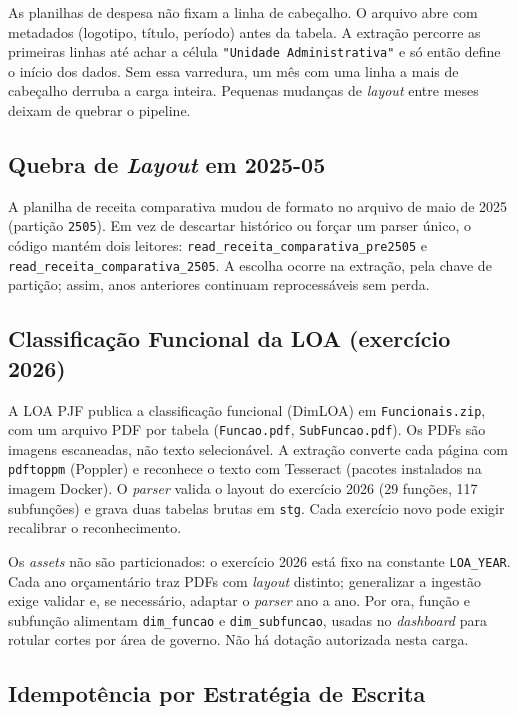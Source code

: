 As planilhas de despesa não fixam a linha de cabeçalho. O arquivo abre com metadados (logotipo, título, período) antes da tabela. A extração percorre as primeiras linhas até achar a célula \texttt{"Unidade Administrativa"} e só então define o início dos dados. Sem essa varredura, um mês com uma linha a mais de cabeçalho derruba a carga inteira. Pequenas mudanças de \textit{layout} entre meses deixam de quebrar o pipeline.

\subsection{Quebra de \textit{Layout} em 2025-05}

A planilha de receita comparativa mudou de formato no arquivo de maio de 2025 (partição \texttt{2505}). Em vez de descartar histórico ou forçar um parser único, o código mantém dois leitores: \texttt{read\_receita\_comparativa\_pre2505} e \texttt{read\_receita\_comparativa\_2505}. A escolha ocorre na extração, pela chave de partição; assim, anos anteriores continuam reprocessáveis sem perda.

\subsection{Classificação Funcional da LOA (exercício 2026)}

A LOA PJF publica a classificação funcional (DimLOA) em \texttt{Funcionais.zip}, com um arquivo PDF por tabela (\texttt{Funcao.pdf}, \texttt{SubFuncao.pdf}). Os PDFs são imagens escaneadas, não texto selecionável. A extração converte cada página com \texttt{pdftoppm} (Poppler) e reconhece o texto com Tesseract (pacotes instalados na imagem Docker). O \textit{parser} valida o layout do exercício 2026 (29 funções, 117 subfunções) e grava duas tabelas brutas em \texttt{stg}. Cada exercício novo pode exigir recalibrar o reconhecimento.

Os \textit{assets} não são particionados: o exercício 2026 está fixo na constante \texttt{LOA\_YEAR}. Cada ano orçamentário traz PDFs com \textit{layout} distinto; generalizar a ingestão exige validar e, se necessário, adaptar o \textit{parser} ano a ano. Por ora, função e subfunção alimentam \texttt{dim\_funcao} e \texttt{dim\_subfuncao}, usadas no \textit{dashboard} para rotular cortes por área de governo. Não há dotação autorizada nesta carga.

\subsection{Idempotência por Estratégia de Escrita}

